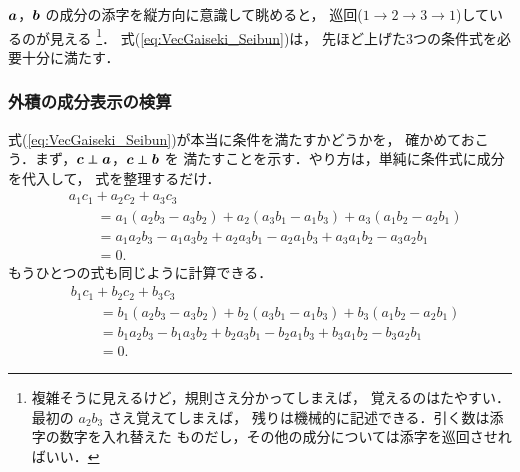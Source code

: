                 $\boldsymbol{a}$，$\boldsymbol{b}$ の成分の添字を縦方向に意識して眺めると，
                巡回($1 \to 2 \to 3 \to 1$)しているのが見える
                    \footnote{
                        複雑そうに見えるけど，規則さえ分かってしまえば，
                        覚えるのはたやすい．最初の $a_{2}b_{3}$ さえ覚えてしまえば，
                        残りは機械的に記述できる．引く数は添字の数字を入れ替えた
                        ものだし，その他の成分については添字を巡回させればいい．
                    }．
                式(\ref{eq:VecGaiseki_Seibun})は，
                先ほど上げた3つの条件式を必要十分に満たす．

                \subsubsection{外積の成分表示の検算}
                式(\ref{eq:VecGaiseki_Seibun})が本当に条件を満たすかどうかを，
                確かめておこう．まず，$\boldsymbol{c} \perp \boldsymbol{a}$，$\boldsymbol{c} \perp \boldsymbol{b}$ を
                満たすことを示す．やり方は，単純に条件式に成分を代入して，
                式を整理するだけ．
                    \begin{align*}
                         &a_{1}c_{1} + a_{2}c_{2} + a_{3}c_{3} \\
                         &\qquad=   a_{1}(a_{2}b_{3} - a_{3}b_{2})
                             + a_{2}(a_{3}b_{1} - a_{1}b_{3}) + a_{3}(a_{1}b_{2} - a_{2}b_{1}) \\
                         &\qquad=   a_{1}a_{2}b_{3} - a_{1}a_{3}b_{2}
                             + a_{2}a_{3}b_{1} - a_{2}a_{1}b_{3} + a_{3}a_{1}b_{2} - a_{3}a_{2}b_{1} \\
                         &\qquad= 0.
                    \end{align*}
                もうひとつの式も同じように計算できる．
                    \begin{align*}
                         &b_{1}c_{1} + b_{2}c_{2} + b_{3}c_{3} \\
                         &\qquad=   b_{1}(a_{2}b_{3} - a_{3}b_{2})
                             + b_{2}(a_{3}b_{1} - a_{1}b_{3}) + b_{3}(a_{1}b_{2} - a_{2}b_{1}) \\
                         &\qquad=   b_{1}a_{2}b_{3} - b_{1}a_{3}b_{2}
                             + b_{2}a_{3}b_{1} - b_{2}a_{1}b_{3} + b_{3}a_{1}b_{2} - b_{3}a_{2}b_{1} \\
                         &\qquad= 0.
                    \end{align*}

